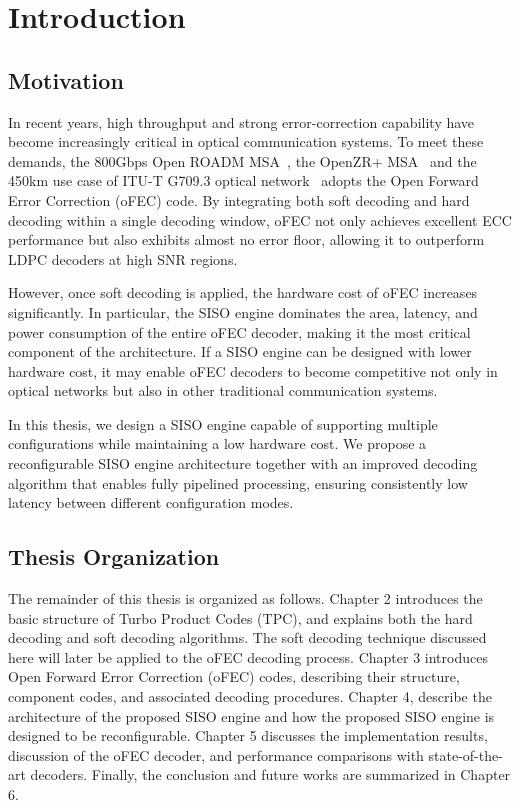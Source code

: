 \chapter{Introduction}
\label{chapter:intro}

\section{Motivation}
In recent years, high throughput and strong error-correction capability have become increasingly critical in optical communication systems. To meet these demands, the 800Gbps Open ROADM MSA~\cite{openROADM}, the OpenZR+ MSA~\cite{openZR} and the 450km use case of ITU-T G709.3 optical network~
\cite{ITUT} adopts the Open Forward Error Correction (oFEC) code. By integrating both soft decoding and hard decoding within a single decoding window, oFEC not only achieves excellent ECC performance but also exhibits almost no error floor, allowing it to outperform LDPC decoders at high SNR regions.

However, once soft decoding is applied, the hardware cost of oFEC increases significantly. In particular, the SISO engine dominates the area, latency, and power consumption of the entire oFEC decoder, making it the most critical component of the architecture. If a SISO engine can be designed with lower hardware cost, it may enable oFEC decoders to become competitive not only in optical networks but also in other traditional communication systems.

In this thesis, we design a SISO engine capable of supporting multiple configurations while maintaining a low hardware cost. We propose a reconfigurable SISO engine architecture together with an improved decoding algorithm that enables fully pipelined processing, ensuring consistently low latency between different configuration modes.
\section{Thesis Organization}
The remainder of this thesis is organized as follows. 
Chapter 2 introduces the basic structure of Turbo Product Codes (TPC), and explains both the hard decoding and soft decoding algorithms. The soft decoding technique discussed here will later be applied to the oFEC decoding process.
Chapter 3 introduces Open Forward Error Correction (oFEC) codes, describing their structure, component codes, and associated decoding procedures.
Chapter 4, describe the architecture of the proposed SISO engine and how the proposed SISO engine is designed to be reconfigurable.
Chapter 5 discusses the implementation results, discussion of the oFEC decoder, and performance comparisons with state-of-the-art decoders.
Finally, the conclusion and future works are summarized in Chapter 6.